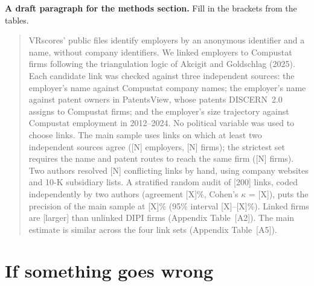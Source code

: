 \documentclass[11pt,a4paper]{article}
\begin{document}
\textbf{A draft paragraph for the methods section.} Fill in the brackets from the tables.

\begin{quote}\small
VRscores' public files identify employers by an anonymous identifier and a name, without company identifiers. We linked employers to Compustat firms following the triangulation logic of Akcigit and Goldschlag (2025). Each candidate link was checked against three independent sources: the employer's name against Compustat company names; the employer's name against patent owners in PatentsView, whose patents DISCERN~2.0 assigns to Compustat firms; and the employer's size trajectory against Compustat employment in 2012--2024. No political variable was used to choose links. The main sample uses links on which at least two independent sources agree ([N] employers, [N] firms); the strictest set requires the name and patent routes to reach the same firm ([N] firms). Two authors resolved [N] conflicting links by hand, using company websites and 10-K subsidiary lists. A stratified random audit of [200] links, coded independently by two authors (agreement [X]\%, Cohen's $\kappa$ = [X]), puts the precision of the main sample at [X]\% (95\% interval [X]--[X]\%). Linked firms are [larger] than unlinked DIPI firms (Appendix Table~[A2]). The main estimate is similar across the four link sets (Appendix Table~[A5]).
\end{quote}

\section{If something goes wrong}\label{sec:trouble}
\end{document}
